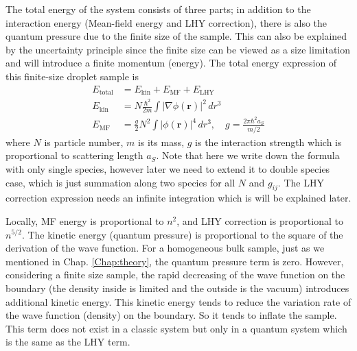 The total energy of the system consists of three parts; in addition to the interaction energy (Mean-field energy and LHY correction), there is also the quantum pressure due to the finite size of the sample. This can also be explained by the uncertainty principle since the finite size can be viewed as a size limitation and will introduce a finite momentum (energy). The total energy expression of this finite-size droplet sample is
\begin{equation}
\begin{split}
E_{\text{total}}&=E_{\text{kin}}+E_{\text{MF}}+E_{\text{LHY}}\\
E_{\text{kin}}&=N \frac{\hbar ^2}{2m}\int \left| \nabla \phi (\pmb{r})\right| ^2 \, dr^3\\
E_{\text{MF}}&=\frac{g}{2}N^2\int \left| \phi (\pmb{r})\right| ^4 \, dr^3,\quad g=\frac{2\pi  \hbar ^2a_S}{m/2}
\end{split}
\end{equation}
where $N$ is particle number, $m$ is its mass, $g$ is the interaction strength which is proportional to scattering length $a_S$. Note that here we write down the formula with only single species, however later we need to extend it to double species case, which is just summation along two species for all $N$ and $g_{ij}$. The LHY correction expression needs an infinite integration which is will be explained later.

Locally, MF energy is proportional to $n^2$, and LHY correction is proportional to $n^{5/2}$. The kinetic energy (quantum pressure) is proportional to the square of the derivation of the wave function. For a homogeneous bulk sample, just as we mentioned in Chap. \ref{Chap:theory}, the quantum pressure term is zero. However, considering a finite size sample, the rapid decreasing of the wave function on the boundary (the density inside is limited and the outside is the vacuum) introduces additional kinetic energy. This kinetic energy tends to reduce the variation rate of the wave function (density) on the boundary. So it tends to inflate the sample. This term does not exist in a classic system but only in a quantum system which is the same as the LHY term. 

